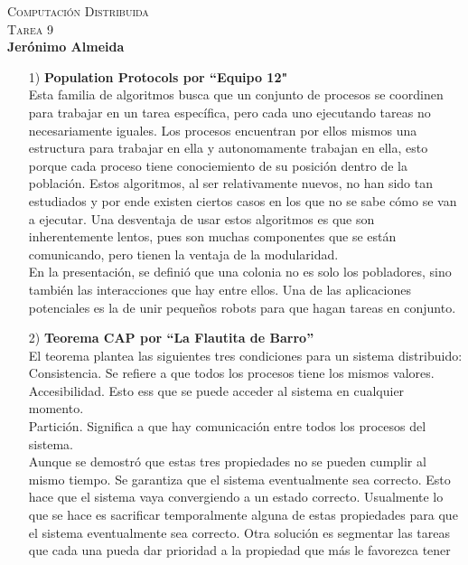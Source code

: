\documentclass[12pt,a4paper]{report}
\begin{document}
\begin{center}
	\textsc{\huge Computación Distribuida\\ Tarea 9\\}
	\textbf{Jerónimo Almeida}
\end{center}
\begin{itemize}
\item[1)]{\textbf{Population Protocols por “Equipo 12"}\\
    Esta familia de algoritmos busca que un conjunto de procesos se
    coordinen para trabajar en un tarea específica, pero cada uno ejecutando
    tareas no necesariamente iguales. Los procesos encuentran por ellos mismos
    una estructura para trabajar en ella y autonomamente trabajan en ella, esto
    porque cada proceso tiene conociemiento de su posición dentro de la
    población. Estos algoritmos, al ser relativamente nuevos, no han sido tan
    estudiados y por ende existen ciertos casos en los que no se sabe cómo se
    van a ejecutar. Una desventaja de usar estos algoritmos es que son
    inherentemente lentos, pues son muchas componentes que se están comunicando, pero tienen la ventaja de la modularidad.\\
    En la presentación, se definió que una colonia no es solo los pobladores,
    sino también las interacciones que hay entre ellos. Una de las aplicaciones
    potenciales es la de unir pequeños robots para que hagan tareas en
    conjunto.
}
\item[2)]{\textbf{Teorema CAP por “La Flautita de Barro”}\\
    El teorema plantea las siguientes tres condiciones para un sistema
    distribuido:\\
    Consistencia. Se refiere a que todos los procesos tiene los mismos
    valores.\\
    Accesibilidad. Esto ess que se puede acceder al sistema en cualquier
    momento.\\
    Partición. Significa a que hay comunicación entre todos los procesos del
    sistema.\\
    Aunque se demostró que estas tres propiedades no se pueden cumplir al mismo
    tiempo. Se garantiza que el sistema eventualmente sea correcto. Esto hace
    que el sistema vaya convergiendo a un estado correcto. Usualmente lo que se
    hace es sacrificar temporalmente alguna de estas propiedades para que el
    sistema eventualmente sea correcto. Otra solución es segmentar las tareas
    que cada una pueda dar prioridad a la propiedad que más le favorezca tener
}
\end{itemize}
\end{document}

